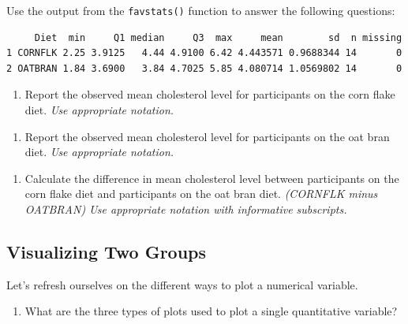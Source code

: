 \documentclass[
  letterpaper,
  DIV=11,
  numbers=noendperiod]{scrartcl}
\providecommand{\tightlist}{%
  \setlength{\itemsep}{0pt}\setlength{\parskip}{0pt}}\usepackage{longtable,booktabs,array}
\begin{document}
Use the output from the \texttt{favstats()} function to answer the
following questions:

\begin{verbatim}
     Diet  min     Q1 median     Q3  max     mean        sd  n missing
1 CORNFLK 2.25 3.9125   4.44 4.9100 6.42 4.443571 0.9688344 14       0
2 OATBRAN 1.84 3.6900   3.84 4.7025 5.85 4.080714 1.0569802 14       0
\end{verbatim}

\vspace{0.8in}

\begin{enumerate}
\def\labelenumi{\arabic{enumi}.}
\setcounter{enumi}{3}
\tightlist
\item
  Report the observed mean cholesterol level for participants on the
  corn flake diet. \emph{Use appropriate notation.}
\end{enumerate}

\vspace{0.3in}

\begin{enumerate}
\def\labelenumi{\arabic{enumi}.}
\setcounter{enumi}{4}
\tightlist
\item
  Report the observed mean cholesterol level for participants on the oat
  bran diet. \emph{Use appropriate notation.}
\end{enumerate}

\vspace{0.3in}

\begin{enumerate}
\def\labelenumi{\arabic{enumi}.}
\setcounter{enumi}{5}
\tightlist
\item
  Calculate the difference in mean cholesterol level between
  participants on the corn flake diet and participants on the oat bran
  diet. \emph{(CORNFLK minus OATBRAN) Use appropriate notation with
  informative subscripts.}
\end{enumerate}

\vspace{0.8in}

\hypertarget{visualizing-two-groups}{%
\subsection{Visualizing Two Groups}\label{visualizing-two-groups}}

Let's refresh ourselves on the different ways to plot a numerical
variable.

\begin{enumerate}
\def\labelenumi{\arabic{enumi}.}
\setcounter{enumi}{7}
\tightlist
\item
  What are the three types of plots used to plot a single quantitative
  variable?
\end{enumerate}
\end{document}
